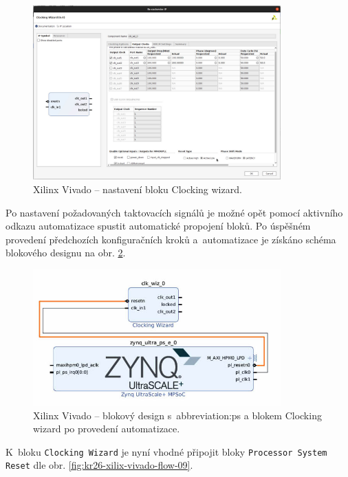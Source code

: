 \documentclass[a4paper, twoside, 11pt]{article}
\begin{document}
				\begin{figure}[htbp!]
					\centering
					\includegraphics[width=0.85\textwidth]{src/png/kr26-xilinx-vivado-flow/kr26-xilix-vivado-flow-07.jpg}
					\caption{Xilinx Vivado – nastavení bloku Clocking wizard.}
					\label{fig:kr26-xilix-vivado-flow-07}
				\end{figure}
				Po nastavení požadovaných taktovacích signálů je možné opět pomocí aktivního odkazu automatizace spustit automatické propojení bloků. Po úspěšném provedení předchozích konfiguračních kroků a~automatizace je získáno schéma blokového designu na obr. \ref{fig:kr26-xilix-vivado-flow-08}.

				\begin{figure}[htbp!]
					\centering
					\includegraphics[width=0.85\textwidth]{src/png/kr26-xilinx-vivado-flow/kr26-xilix-vivado-flow-08.jpg}
					\caption{Xilinx Vivado – blokový design s~\gls{abbreviation:ps} a blokem Clocking wizard po provedení automatizace.}
					\label{fig:kr26-xilix-vivado-flow-08}
				\end{figure}

				K~bloku \texttt{Clocking Wizard} je nyní vhodné připojit bloky \texttt{Processor System Reset} dle obr. \ref{fig:kr26-xilix-vivado-flow-09}.
\end{document}
